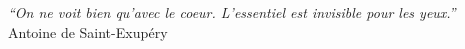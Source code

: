 \cleardoublepage
\thispagestyle{plain}

\vspace*{8cm}

\begin{flushright}
   \textsl{``On ne voit bien qu’avec le coeur. L’essentiel est invisible pour les yeux.''} \\
\vspace*{1.5cm}
    Antoine de Saint-Exupéry
\end{flushright}
